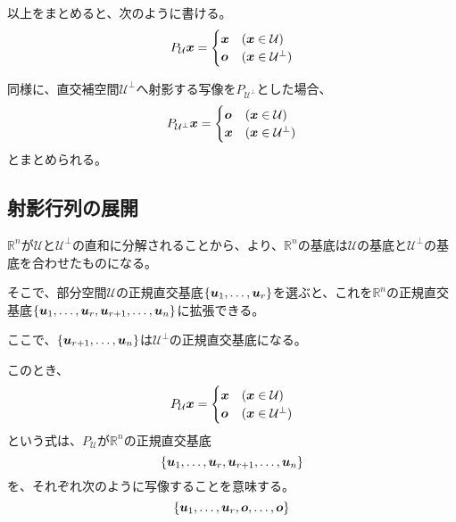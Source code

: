 \documentclass[../../../topic_linear-algebra]{subfiles}
\begin{document}
\br

以上をまとめると、次のように書ける。
\begin{equation*}
  P_{\mathcal{U}}\vb*{x} = \begin{cases}
    \vb*{x} & (\vb*{x} \in \mathcal{U})         \\
    \vb*{o} & (\vb*{x} \in \mathcal{U}^{\perp})
  \end{cases}
\end{equation*}

\br

同様に、直交補空間$\mathcal{U}^\perp$へ射影する写像を$P_{\mathcal{U}^\perp}$とした場合、
\begin{equation*}
  P_{\mathcal{U}^{\perp}}\vb*{x} = \begin{cases}
    \vb*{o} & (\vb*{x} \in \mathcal{U})         \\
    \vb*{x} & (\vb*{x} \in \mathcal{U}^{\perp})
  \end{cases}
\end{equation*}
とまとめられる。

\subsection{射影行列の展開}\label{sec:projection-matrix-expansion}

$\mathbb{R}^n$が$\mathcal{U}$と$\mathcal{U}^\perp$の直和に分解されることから、より、$\mathbb{R}^n$の基底は$\mathcal{U}$の基底と$\mathcal{U}^\perp$の基底を合わせたものになる。

\br

そこで、部分空間$\mathcal{U}$の正規直交基底$\{\vb*{u}_1, \ldots, \vb*{u}_r\}$を選ぶと、これを$\mathbb{R}^n$の正規直交基底$\{ \vb*{u}_1, \ldots, \vb*{u}_r, \vb*{u}_{r+1}, \ldots, \vb*{u}_n \}$に拡張できる。

ここで、$\{ \vb*{u}_{r+1}, \ldots, \vb*{u}_n \}$は$\mathcal{U}^\perp$の正規直交基底になる。

\br

このとき、
\begin{equation*}
  P_{\mathcal{U}}\vb*{x} = \begin{cases}
    \vb*{x} & (\vb*{x} \in \mathcal{U})         \\
    \vb*{o} & (\vb*{x} \in \mathcal{U}^{\perp})
  \end{cases}
\end{equation*}
という式は、$P_{\mathcal{U}}$が$\mathbb{R}^n$の正規直交基底
\begin{equation*}
  \{ \vb*{u}_1, \ldots, \vb*{u}_r, \vb*{u}_{r+1}, \ldots, \vb*{u}_n \}
\end{equation*}
を、それぞれ次のように写像することを意味する。
\begin{equation*}
  \{ \vb*{u}_1, \ldots, \vb*{u}_r, \vb*{o}, \ldots, \vb*{o} \}
\end{equation*}
\end{document}
